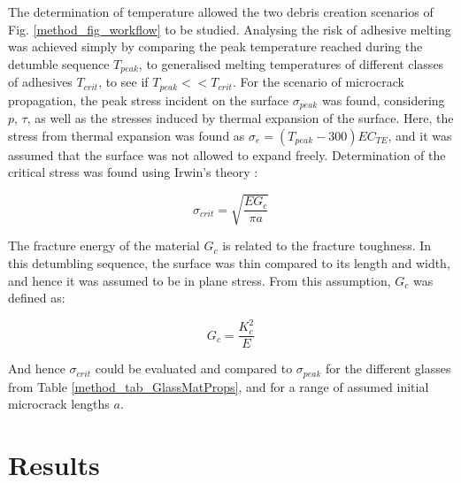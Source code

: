 \documentclass[journal]{new-aiaa}
\begin{document}
The determination of temperature allowed the two debris creation scenarios of Fig. \ref{method_fig_workflow} to be studied. Analysing the risk of adhesive melting was achieved simply by comparing the peak temperature reached during the detumble sequence $T_{peak}$, to generalised melting temperatures of different classes of adhesives $T_{crit}$, to see if $T_{peak} << T_{crit}$. For the scenario of microcrack propagation, the peak stress incident on the surface $\sigma_{peak}$ was found, considering $p$, $\tau$, as well as the stresses induced by thermal expansion of the surface. Here, the stress from thermal expansion was found as $\sigma_e = (T_{peak}-300) E C_{TE}$, and it was assumed that the surface was not allowed to expand freely. Determination of the critical stress was found using Irwin's theory \cite{irwinCONTINUUMMECHANICSVIEWCRACK1965}: 

\begin{equation}
    \sigma_{crit} = \sqrt{\frac{E G_c}{\pi a}}
\end{equation}

The fracture energy of the material $G_c$ is related to the fracture toughness. In this detumbling sequence, the surface was thin compared to its length and width, and hence it was assumed to be in plane stress. From this assumption, $G_c$ was defined as:

\begin{equation}
    G_c = \frac{K_c^2}{E}
\end{equation}

And hence $\sigma_{crit}$ could be evaluated and compared to $\sigma_{peak}$ for the different glasses from Table \ref{method_tab_GlassMatProps}, and for a range of assumed initial microcrack lengths $a$.






\newpage
\section{Results}
\label{Section_Results}


\end{document}
